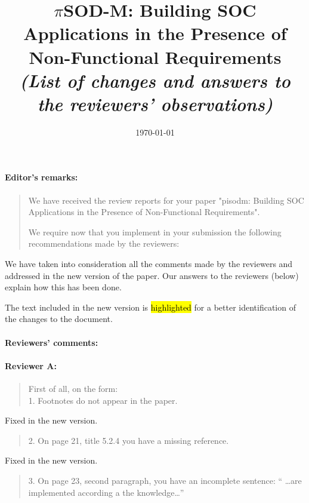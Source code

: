 \documentclass[12pt,a4wide]{article}
\title{$\pi$SOD-M: Building SOC Applications in the Presence of Non-Functional Requirements\\[3mm]
\textit{\large (List of changes and answers to the reviewers' observations)}}
\date{\today}
\begin{document}
\maketitle

\paragraph*{Editor's remarks:}
\begin{quotation}\sf\footnotesize

We have received the review reports for your paper "pisodm: Building SOC Applications in the Presence of Non-Functional Requirements". 

We require now that you implement in your submission the following recommendations made by the reviewers: 


\end{quotation}

\noindent 
We have taken into consideration all the comments made by the reviewers and addressed in the new version of the paper. 
Our answers to the reviewers (below) explain how this has been done. 

The text included in the new version is \hl{highlighted} for a better identification of the changes to the document.

\paragraph*{Reviewers' comments:}

\paragraph*{Reviewer A:} 
\begin{quotation}\sf\footnotesize
\noindent 
First of all, on the form: \\
1.    Footnotes do not appear in the paper. 
\end{quotation}

\noindent 
Fixed in the new version.


\begin{quotation}\sf\footnotesize

2.    On page 21, title 5.2.4 you have a missing reference. 
\end{quotation}

\noindent 
Fixed in the new version.

\begin{quotation}\sf\footnotesize

3.    On page 23, second paragraph, you have an incomplete sentence: `` \dots are implemented according a the knowledge\dots ''
\end{quotation}
\end{document}
